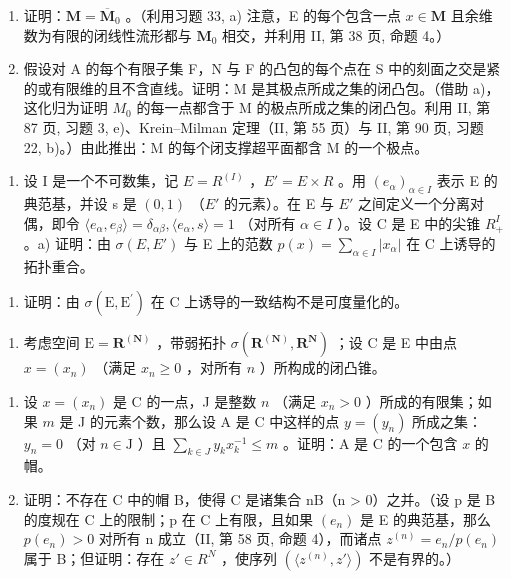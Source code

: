 \begin{enumerate}
\def\labelenumi{\alph{enumi})}
\item
  证明：\(\mathbf{M} = \overline{\mathbf{M}}_0\) 。（利用习题 33, a) 注意，E 的每个包含一点 \(x \in \mathbf{M}\) 且余维数为有限的闭线性流形都与 \(\mathbf{M}_0\) 相交，并利用 II, 第 38 页, 命题 4。）
\item
  假设对 A 的每个有限子集 F，N 与 F 的凸包的每个点在 S 中的刻面之交是紧的或有限维的且不含直线。证明：M 是其极点所成之集的闭凸包。（借助 a)，这化归为证明 \(M_{0}\) 的每一点都含于 M 的极点所成之集的闭凸包。利用 II, 第 87 页, 习题 3, e)、Krein--Milman 定理（II, 第 55 页）与 II, 第 90 页, 习题 22, b)。）由此推出：M 的每个闭支撑超平面都含 M 的一个极点。
\end{enumerate}

\begin{enumerate}
\def\labelenumi{\arabic{enumi})}
\setcounter{enumi}{34}
\tightlist
\item
  设 I 是一个不可数集，记 \(E = R^{(I)}\) ，\(E' = E \times R\) 。用 \((e_{\alpha})_{\alpha \in I}\) 表示 E 的典范基，并设 s 是 \((0, 1)\) （\(E'\) 的元素）。在 E 与 \(E'\) 之间定义一个分离对偶，即令 \(\langle e_{\alpha}, e_{\beta} \rangle = \delta_{\alpha\beta}, \langle e_{\alpha}, s \rangle = 1\) （对所有 \(\alpha \in I\) ）。设 C 是 E 中的尖锥 \(R_{+}^{I}\) 。a) 证明：由 \(\sigma(E, E')\) 与 E 上的范数 \(p(x) = \sum_{\alpha \in I} |x_{\alpha}|\) 在 C 上诱导的拓扑重合。
\end{enumerate}

\begin{enumerate}
\def\labelenumi{\alph{enumi})}
\setcounter{enumi}{1}
\tightlist
\item
  证明：由 \(\sigma(\mathrm{E},\mathrm{E}^{\prime})\) 在 C 上诱导的一致结构不是可度量化的。
\end{enumerate}

\begin{enumerate}
\def\labelenumi{\arabic{enumi})}
\setcounter{enumi}{35}
\tightlist
\item
  考虑空间 \(\mathrm{E} = \mathbf{R}^{(\mathbf{N})}\) ，带弱拓扑 \(\sigma (\mathbf{R}^{(\mathbf{N})},\mathbf{R}^{\mathbf{N}})\) ；设 C 是 E 中由点 \(x = (x_{n})\) （满足 \(x_{n}\geqslant 0\) ，对所有 \(n\) ）所构成的闭凸锥。\\
\end{enumerate}

\begin{enumerate}
\def\labelenumi{\alph{enumi})}
\item
  设 \(x = (x_{n})\) 是 C 的一点，J 是整数 \(n\) （满足 \(x_{n} > 0\) ）所成的有限集；如果 \(m\) 是 J 的元素个数，那么设 A 是 C 中这样的点 \(y = (y_{n})\) 所成之集：\(y_{n} = 0\) （对 \(n\in \mathrm{J}\) ）且 \(\sum_{k\in J}y_kx_k^{-1}\leqslant m\) 。证明：A 是 C 的一个包含 \(x\) 的帽。
\item
  证明：不存在 C 中的帽 B，使得 C 是诸集合 nB（n \textgreater{} 0）之并。（设 p 是 B 的度规在 C 上的限制；p 在 C 上有限，且如果 \((e_{n})\) 是 E 的典范基，那么 \(p(e_{n}) > 0\) 对所有 n 成立（II, 第 58 页, 命题 4），而诸点 \(z^{(n)} = e_{n}/p(e_{n})\) 属于 B；但证明：存在 \(z' \in R^{N}\) ，使序列 \((\langle z^{(n)}, z' \rangle)\) 不是有界的。）
\end{enumerate}

